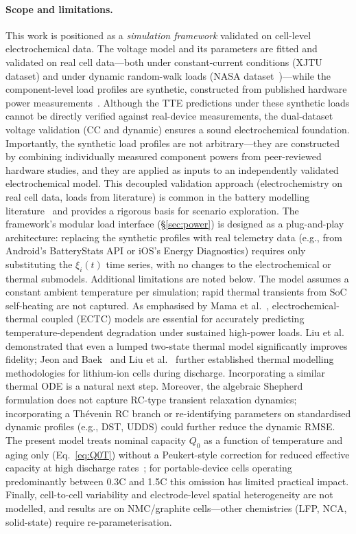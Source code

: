 \documentclass[5p,times,number]{elsarticle}
\newcommand{\ssref}[1]{\textcolor{supercolor}{\S\ref{#1}}}
\newcommand{\eqnrefp}[1]{\textcolor{supercolor}{Eq.~\ref{#1}}}
\begin{document}
\paragraph{Scope and limitations.}
This work is positioned as a \emph{simulation framework} validated on cell-level electrochemical data.
The voltage model and its parameters are fitted and validated on real cell data---both under constant-current conditions (XJTU dataset) and under dynamic random-walk loads (NASA dataset~\cite{Bole2014})---while the component-level load profiles are synthetic, constructed from published hardware power measurements~\cite{Carroll2010,Chen2014,Lu2008}.
Although the TTE predictions under these synthetic loads cannot be directly verified against real-device measurements, the dual-dataset voltage validation (CC and dynamic) ensures a sound electrochemical foundation.
Importantly, the synthetic load profiles are not arbitrary---they are constructed by combining individually measured component powers from peer-reviewed hardware studies, and they are applied as inputs to an independently validated electrochemical model.
This decoupled validation approach (electrochemistry on real cell data, loads from literature) is common in the battery modelling literature~\cite{Fuller2014,Mama2025} and provides a rigorous basis for scenario exploration.
The framework's modular load interface (\ssref{sec:power}) is designed as a plug-and-play architecture: replacing the synthetic profiles with real telemetry data (e.g., from Android's BatteryStats API or iOS's Energy Diagnostics) requires only substituting the $\xi_i(t)$ time series, with no changes to the electrochemical or thermal submodels.
Additional limitations are noted below.
The model assumes a constant ambient temperature per simulation; rapid thermal transients from SoC self-heating are not captured.
As emphasised by Mama et al.~\cite{Mama2025}, electrochemical-thermal coupled (ECTC) models are essential for accurately predicting temperature-dependent degradation under sustained high-power loads.
Liu et al.~\cite{Liu2019ECM} demonstrated that even a lumped two-state thermal model significantly improves fidelity; Jeon and Baek~\cite{Jeon2011ECM} and Liu et al.~\cite{Liu2017ECM} further established thermal modelling methodologies for lithium-ion cells during discharge. Incorporating a similar thermal ODE is a natural next step.
Moreover, the algebraic Shepherd formulation does not capture RC-type transient relaxation dynamics; incorporating a Th\'{e}venin RC branch or re-identifying parameters on standardised dynamic profiles (e.g., DST, UDDS) could further reduce the dynamic RMSE.
The present model treats nominal capacity $Q_0$ as a function of temperature and aging only (\eqnrefp{eq:Q0T}) without a Peukert-style correction for reduced effective capacity at high discharge rates~\cite{Fuller2014}; for portable-device cells operating predominantly between 0.3C and 1.5C this omission has limited practical impact.
Finally, cell-to-cell variability and electrode-level spatial heterogeneity are not modelled, and results are on NMC/graphite cells---other chemistries (LFP, NCA, solid-state) require re-parameterisation.
\end{document}
